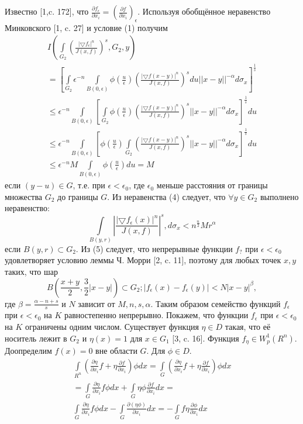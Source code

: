 Известно [1,c. 172], что $\frac{\partial f_\epsilon}{\partial x_i}=\left(\frac{\partial f}{\partial x_i}\right)_\epsilon$. Используя обобщённое неравенство Минковского [1, c. 27] и условие (1) получим
\begin{multline}
I\left(\int\limits_{G_2}\left(\frac{|\bigtriangledown f_{\epsilon}|^{n}}{J(x,f)}\right)^s, G_{2},y\right)\\
=\left[ \int\limits_{G_2}\epsilon^{-n}\int\limits_{B(0,\epsilon)}\phi\left(\frac{u}{\epsilon}\right)\left(\frac{|\bigtriangledown f(x-y)|^{n}}{J(x,f)}\right)^{s}
du||x-y||^{-\alpha}d\sigma_{x}\right]^{\frac{1}{s}}\\
\leq\epsilon^{-n}\int\limits_{B(0,\epsilon)}\left[\int\limits_{G_2}\phi\left(\frac{u}{\epsilon}\right)\left(\frac{|\bigtriangledown f(x-y)|^{n}}{J(x,f)}\right)^{s}||x-y||^{-\alpha}d\sigma_{x}\right]^{\frac{1}{s}}du
\\\leq\epsilon^{-n}\int\limits_{B(0,\epsilon)}\left[\phi\left(\frac{u}{\epsilon}\right)\int\limits_{G_2}\left(\frac{|\bigtriangledown f(x-y)|^{n}}{J(x,f)}\right)^{s}||x-y||^{-\alpha}d\sigma_{x}\right]^{\frac{1}{s}}du\\
\leq\epsilon^{-n}M\int\limits_{B(0,\epsilon)}\phi\left(\frac{u}{\epsilon}\right)du=M
\end{multline}
если $(y-u)\in G$, т.е. при $\epsilon<\epsilon_0$, где $\epsilon_0$ меньше расстояния от границы множества $G_2$ до границы $G$. Из неравенства (4) следует, что $\forall y\in G_2$ выполнено неравенство:
\begin{equation}
\int\limits_{B(y,r)}\left|\frac{|\bigtriangledown f_{\epsilon}(x)|^{n}}{J(x,f)}\right|^s, d\sigma_{x}<n^{\frac{n}{2}}Mr^\alpha
\end{equation}
если $B(y,r)\subset G_2$.
Из (5) следует, что непрерывные функции $f_?$ при $\epsilon<\epsilon_0$ удовлетворяет условию леммы Ч. Морри [2, c. 11], поэтому для любых точек $x, y$ таких, что шар
$$
B\left(\frac{x+y}{2},\frac{3}{2}|x-y|\right)\subset G_{2}; |f_{\epsilon}(x)-f_{\epsilon}(y)|<N|x-y|^\beta,
$$
где $\beta=\frac{\alpha-n+s}{s}$ и $N$ зависит от $M,n,s,\alpha$.
Таким образом семейство функций $f_\epsilon$ при $\epsilon<\epsilon_0$ на $K$ равностепенно непрерывно. Покажем, что функции $f_\epsilon$ при $\epsilon<\epsilon_0$ на $K$ ограничены одним числом. Существует функция $\eta\in D$ такая, что её носитель лежит в $G_2$ и $\eta(x)=1$ для $x\in G_1$ [3, c. 16]. Функция $f_{\eta}\in W_{p}^{1} (R^n)$. Доопределим $f(x)=0$ вне области $G$. Для $\phi\in D$.
\begin{multline}
\int\limits_{R^n}\left(\frac{\partial\eta}{\partial x_i}f+\eta\frac{\partial f}{\partial x_i}\right)\phi dx
= \int\limits_{G}\left(\frac{\partial\eta}{\partial x_i}f+\eta\frac{\partial f}{\partial x_i}\right)\phi dx\\
=\int\limits_{G}\frac{\partial\eta}{\partial x_i}f\phi dx+\int\limits_{G}\eta\phi\frac{\partial f}{\partial x_i}dx=\\
\int\limits_{G}\frac{\partial\eta}{\partial x_i}f\phi dx-\int\limits_{G}\frac{\partial(\eta\phi)}{\partial x_i}dx=-\int\limits_{G}f\eta\frac{\partial\phi}{\partial x_i}dx\\
\end{multline}


